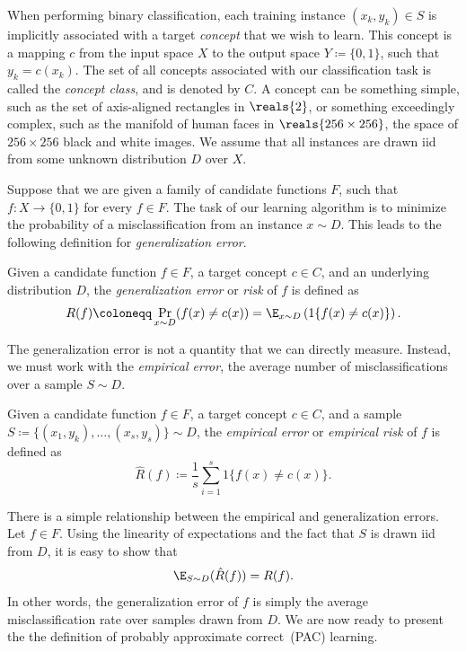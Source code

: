 \documentclass[11pt,a4paper]{article}
\numberwithin{equation}{section}
\newcommand{\ind}[1]{1\{#1\}}
\begin{document}
When performing binary classification, each training instance $(x_k, y_k) \in S$
is implicitly associated with a target \emph{concept} that we wish to learn.
This concept is a mapping $c$ from the input space $X$ to the output space $Y
\coloneqq \{0, 1\}$, such that $y_k = c(x_k)$. The set of all concepts
associated with our classification task is called the \emph{concept class}, and
is denoted by $C$. A concept can be something simple, such as the set of
axis-aligned rectangles in $\reals{2}$, or something exceedingly complex, such
as the manifold of human faces in $\reals{256 \times 256}$, the space of $256
\times 256$ black and white images. We assume that all instances are drawn iid
from some unknown distribution $D$ over $X$.

Suppose that we are given a family of candidate functions $F$, such that $f : X
\to \{0, 1\}$ for every $f \in F$. The task of our learning algorithm is to
minimize the probability of a misclassification from an instance $x \sim D$.
This leads to the following definition for \emph{generalization error}.

\begin{definition}
Given a candidate function $f \in F$, a target concept $c \in C$, and an
underlying distribution $D$, the \emph{generalization error} or \emph{risk} of
$f$ is defined as
\[
	R(f) \coloneqq \Pr_{x \sim D}(f(x) \neq c(x)) =
		\E_{x \sim D} \left(\ind{f(x) \neq c(x)}\right).
\]
\end{definition}

The generalization error is not a quantity that we can directly measure.
Instead, we must work with the \emph{empirical error}, the average number of
misclassifications over a sample $S \sim D$.

\begin{definition}
Given a candidate function $f \in F$, a target concept $c \in C$, and a sample
$S \coloneqq \{(x_1, y_k), \ldots, (x_s, y_s)\} \sim D$, the \emph{empirical
error} or \emph{empirical risk} of $f$ is defined as
\[
	\hat{R}(f) \coloneqq \frac{1}{s} \sum_{i = 1}^s \ind{f(x) \neq c(x)}.
\]
\end{definition}

There is a simple relationship between the empirical and generalization errors.
Let $f \in F$.  Using the linearity of expectations and the fact that $S$ is
drawn iid from $D$, it is easy to show that
\[
	\E_{S \sim D} (\hat{R}(f)) = R(f).
\]
In other words, the generalization error of $f$ is simply the average
misclassification rate over samples drawn from $D$. We are now ready to present
the the definition of probably approximate correct~(PAC) learning.
\end{document}
